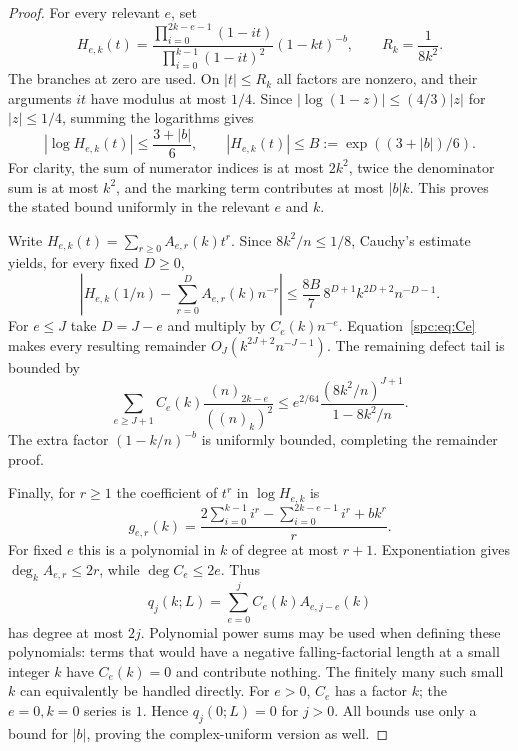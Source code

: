 \documentclass[11pt,letterpaper]{article}
\theoremstyle{definition}\newtheorem{definition}[theorem]{Definition}
\theoremstyle{remark}\newtheorem{remark}[theorem]{Remark}
\newcommand{\fall}[2]{(#1)_{#2}}
\begin{document}
\begin{proof}
For every relevant $e$, set
\[
 H_{e,k}(t)=\frac{\prod_{i=0}^{2k-e-1}(1-it)}
                 {\prod_{i=0}^{k-1}(1-it)^2}(1-kt)^{-b},
 \qquad R_k=\frac1{8k^2}.
\]
The branches at zero are used. On $|t|\le R_k$ all factors are nonzero, and their arguments $it$ have modulus at most $1/4$. Since
$|\log(1-z)|\le(4/3)|z|$ for $|z|\le1/4$, summing the logarithms gives
\[
 |\log H_{e,k}(t)|\le\frac{3+|b|}{6},\qquad
 |H_{e,k}(t)|\le B:=\exp((3+|b|)/6).
\]
For clarity, the sum of numerator indices is at most $2k^2$, twice the denominator sum is at most $k^2$, and the marking term contributes at most $|b|k$. This proves the stated bound uniformly in the relevant $e$ and $k$.

Write $H_{e,k}(t)=\sum_{r\ge0}A_{e,r}(k)t^r$. Since $8k^2/n\le1/8$, Cauchy's estimate yields, for every fixed $D\ge0$,
\begin{equation}\label{spc:eq:cauchy}
 \left|H_{e,k}(1/n)-\sum_{r=0}^DA_{e,r}(k)n^{-r}\right|
 \le\frac{8B}{7}\,8^{D+1}k^{2D+2}n^{-D-1}.
\end{equation}
For $e\le J$ take $D=J-e$ and multiply by $C_e(k)n^{-e}$. Equation~\eqref{spc:eq:Ce} makes every resulting remainder
$O_J(k^{2J+2}n^{-J-1})$. The remaining defect tail is bounded by
\[
 \sum_{e\ge J+1}C_e(k)\frac{\fall n{2k-e}}{(\fall nk)^2}
 \le e^{2/64}\frac{(8k^2/n)^{J+1}}{1-8k^2/n}.
\]
The extra factor $(1-k/n)^{-b}$ is uniformly bounded, completing the remainder proof.

Finally, for $r\ge1$ the coefficient of $t^r$ in $\log H_{e,k}$ is
\begin{equation}\label{spc:eq:logH}
 g_{e,r}(k)=\frac{2\sum_{i=0}^{k-1}i^r-
                    \sum_{i=0}^{2k-e-1}i^r+bk^r}{r}.
\end{equation}
For fixed $e$ this is a polynomial in $k$ of degree at most $r+1$. Exponentiation gives $\deg_k A_{e,r}\le2r$, while $\deg C_e\le2e$. Thus
\begin{equation}\label{spc:eq:qconstruct}
 q_j(k;L)=\sum_{e=0}^j C_e(k)A_{e,j-e}(k)
\end{equation}
has degree at most $2j$. Polynomial power sums may be used when defining these polynomials: terms that would have a negative falling-factorial length at a small integer $k$ have $C_e(k)=0$ and contribute nothing. The finitely many such small $k$ can equivalently be handled directly. For $e>0$, $C_e$ has a factor $k$; the $e=0,k=0$ series is $1$. Hence $q_j(0;L)=0$ for $j>0$. All bounds use only a bound for $|b|$, proving the complex-uniform version as well.
\end{proof}
\end{document}
